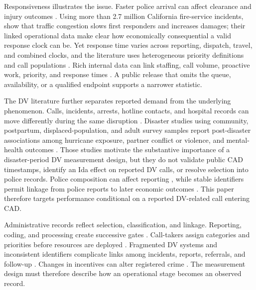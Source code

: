 \documentclass[11pt]{article}
\begin{document}
Responsiveness illustrates the issue. Faster police arrival can affect clearance and injury outcomes \citep{BlanesKirchmaier2018,DeAngeloTogerWeisburd2023}. Using more than 2.7 million California fire-service incidents, \citet{BrentBeland2020} show that traffic congestion slows first responders and increases damages; their linked operational data make clear how economically consequential a valid response clock can be. Yet response time varies across reporting, dispatch, travel, and combined clocks, and the literature uses heterogeneous priority definitions and call populations \citep{VerlaanRuiter2023}. Rich internal data can link staffing, call volume, proactive work, priority, and response times \citep{MourtgosAdamsNix2024}. A public release that omits the queue, availability, or a qualified endpoint supports a narrower statistic.

The DV literature further separates reported demand from the underlying phenomenon. Calls, incidents, arrests, hotline contacts, and hospital records can move differently during the same disruption \citep{LeslieWilson2020,BullingerCarrPackham2021,MillerSegalSpencer2022,MillerSegalSpencer2024}. Disaster studies using community, postpartum, displaced-population, and adult survey samples report post-disaster associations among hurricane exposure, partner conflict or violence, and mental-health outcomes \citep{AnastarioShehabLawry2009,SchumacherEtAl2010,HarvilleTaylorTesfai2011,FirstEtAl2022}. Those studies motivate the substantive importance of a disaster-period DV measurement design, but they do not validate public CAD timestamps, identify an Ida effect on reported DV calls, or resolve selection into police records. Police composition can affect reporting \citep{MillerSegal2019}, while stable identifiers permit linkage from police reports to later economic outcomes \citep{AdamsHuttunenNixZhang2024}. This paper therefore targets performance conditional on a reported DV-related call entering CAD.

Administrative records reflect selection, classification, and linkage. Reporting, coding, and processing create successive gates \citep{KlingerBridges1997,BoivinCordeau2011,BoivinOuellet2014,SimpsonOrosco2021,KnoxLoweMummolo2020}. Call-takers assign categories and priorities before resources are deployed \citep{Pandey2025}. Fragmented DV systems and inconsistent identifiers complicate links among incidents, reports, referrals, and follow-up \citep{Phoenix2023,VomfellPovala2023}. Changes in incentives can alter registered crime \citep{AhmedLatifVyborny2026}. The measurement design must therefore describe how an operational stage becomes an observed record.
\end{document}
